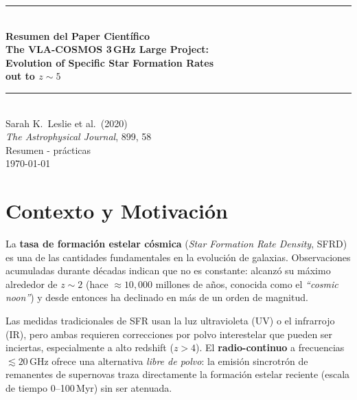 \documentclass[12pt, a4paper]{article}
\begin{document}
\begin{titlepage}
    \centering
    \vspace*{2cm}
    {\color{azulcosmos}\rule{\linewidth}{1.5pt}}\\[0.4cm]
    {\LARGE\bfseries\color{azulcosmos}
        Resumen del Paper Científico}\\[0.3cm]
    {\large\bfseries
        The VLA-COSMOS 3\,GHz Large Project:\\[0.2cm]
        Evolution of Specific Star Formation Rates\\
        out to $z \sim 5$}\\[0.3cm]
    {\color{azulcosmos}\rule{\linewidth}{1.5pt}}\\[1.0cm]
    {\large Sarah K.\ Leslie et al.\ (2020)}\\[0.2cm]
    {\normalsize \textit{The Astrophysical Journal}, 899, 58}\\[2cm]
    {\normalsize Resumen - prácticas}\\[0.5cm]
    {\normalsize \today}
    \vfill
\end{titlepage}

\tableofcontents
\newpage

\section{Contexto y Motivación}

La \textbf{tasa de formación estelar cósmica} (\textit{Star Formation Rate Density}, SFRD)
es una de las cantidades fundamentales en la evolución de galaxias. Observaciones acumuladas
durante décadas indican que no es constante: alcanzó su máximo alrededor de
$z \sim 2$ (hace $\approx 10{,}000$ millones de años, conocida como el
\textit{``cosmic noon''}) y desde entonces ha declinado en más de un orden de magnitud.

Las medidas tradicionales de SFR usan la luz ultravioleta (UV) o el infrarrojo (IR),
pero ambas requieren correcciones por polvo interestelar que pueden ser inciertas,
especialmente a alto redshift ($z > 4$). El \textbf{radio-continuo} a frecuencias
$\lesssim 20$\,GHz ofrece una alternativa \textit{libre de polvo}: la emisión
sincrotrón de remanentes de supernovas traza directamente la formación estelar
reciente (escala de tiempo 0--100\,Myr) sin ser atenuada.
\end{document}
